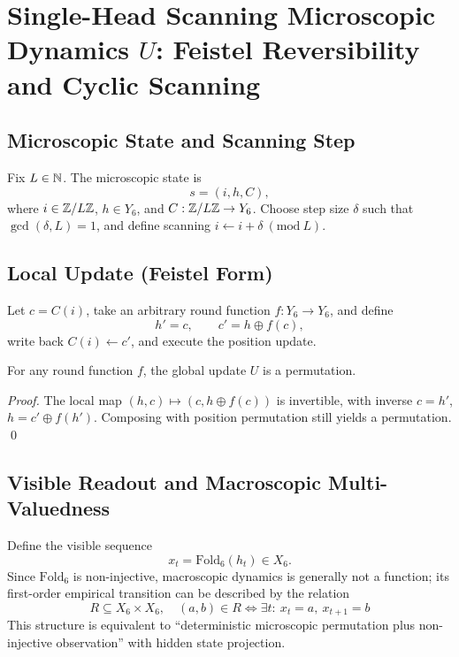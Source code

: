 \section{Single-Head Scanning Microscopic Dynamics \texorpdfstring{$U$}{U}: Feistel Reversibility and Cyclic Scanning}
\label{sec:single-head}

\subsection{Microscopic State and Scanning Step}

Fix $L\in\mathbb{N}$. The microscopic state is
\[
s=(i,h,C),
\]
where $i\in\mathbb{Z}/L\mathbb{Z}$, $h\in Y_6$, and $C:\mathbb{Z}/L\mathbb{Z}\to Y_6$. Choose step size $\delta$ such that $\gcd(\delta,L)=1$, and define scanning $i\leftarrow i+\delta\ (\mathrm{mod}\ L)$.

\subsection{Local Update (Feistel Form)}

Let $c=C(i)$, take an arbitrary round function $f:Y_6\to Y_6$, and define
\[
h'=c,\qquad c'=h\oplus f(c),
\]
write back $C(i)\leftarrow c'$, and execute the position update.

\begin{theorem}[reversibility]\label{thm:feistel-permutation}
For any round function $f$, the global update $U$ is a permutation.
\end{theorem}

\begin{proof}
The local map $(h,c)\mapsto (c,h\oplus f(c))$ is invertible, with inverse $c=h'$, $h=c'\oplus f(h')$. Composing with position permutation still yields a permutation. \qed
\end{proof}

\subsection{Visible Readout and Macroscopic Multi-Valuedness}

Define the visible sequence
\[
x_t=\mathrm{Fold}_6(h_t)\in X_6.
\]
Since $\mathrm{Fold}_6$ is non-injective, macroscopic dynamics is generally not a function; its first-order empirical transition can be described by the relation
\[
R\subseteq X_6\times X_6,\quad (a,b)\in R\iff \exists t:\ x_t=a,\ x_{t+1}=b
\]
This structure is equivalent to ``deterministic microscopic permutation plus non-injective observation'' with hidden state projection.

